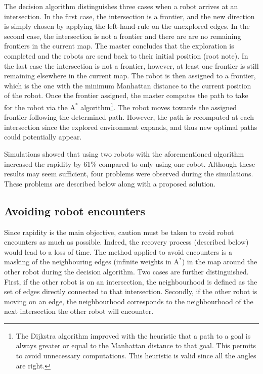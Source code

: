 \documentclass[12pt]{report}
\begin{document}
The decision algorithm distinguishes three cases when a robot arrives at an intersection. In the first case, the intersection is a frontier, and the new direction is simply chosen by applying the left-hand-rule on the unexplored edges. In the second case, the intersection is not a frontier and there are are no remaining frontiers in the current map. The master concludes that the exploration is completed and the robots are send back to their initial position (root note). In the last case the intersection is not a frontier, however, at least one frontier is still remaining elsewhere in the current map. The robot is then assigned to a frontier, which is the one with the minimum Manhattan distance to the current position of the robot. Once the frontier assigned, the master computes the path to take for the robot via the $\text{A}^*$ algorithm\footnote{The Dijkstra algorithm improved with the heuristic that a path to a goal is always greater or equal to the Manhattan distance to that goal. This permits to avoid unnecessary computations. This heuristic is valid since all the angles are right.}. The robot moves towards the assigned frontier following the determined path. However, the path is recomputed at each intersection since the explored environment expands, and thus new optimal paths could potentially appear.
 
Simulations showed that using two robots with the aforementioned algorithm increased the rapidity by 61\% compared to only using one robot. Although these results may seem sufficient, four problems were observed during the simulations. These problems are described below along with a proposed solution. 

\subsection*{Avoiding robot encounters}
Since rapidity is the main objective, caution must be taken to avoid robot encounters as much as possible. Indeed, the recovery process (described below) would lead to a loss of time. The method applied to avoid encounters is a masking of the neighbouring edges (infinite weights in $\text{A}^*$) in the map around the other robot during the decision algorithm. Two cases are further distinguished. First, if the other robot is on an intersection, the neighbourhood is defined as the set of edges directly connected to that intersection. Secondly, if the other robot is moving on an edge, the neighbourhood corresponds to the neighbourhood of the next intersection the other robot will encounter. 
\end{document}
